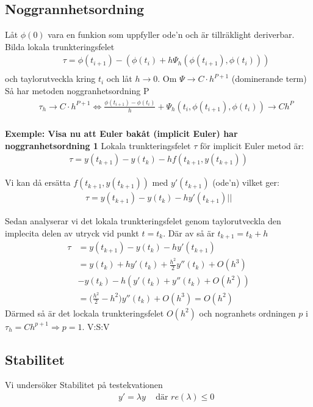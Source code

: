 \documentclass{article}
\begin{document}
\subsection{Noggrannhetsordning}
Låt $\phi(0)$ vara en funkion som uppfyller ode'n och är tillräklight deriverbar.
Bilda lokala trunkteringsfelet
\begin{align*}
  &\quad \tau = \phi(t_{i+1})-(\phi(t_i)+h\Psi_h(\phi(t_{i+1}),\phi(t_i))) \\
\end{align*}
och taylorutveckla kring $t_i$ och låt $h\to0$. 
Om $\Psi\to{C\cdot{h^{P+1}}}$ (dominerande term)
Så har metoden noggranhetsordning P
\begin{align*}
  &\quad \tau_h\to{C\cdot{h^{P+1}}} \Leftrightarrow \frac{\phi(t_{i+1})-\phi(t_i)}{h}+\Psi_h(t_i,\phi(t_{i+1}),\phi(t_i))\to{Ch^P} \\
\end{align*}


\textbf{Exemple: Visa nu att Euler bakåt (implicit Euler) har noggranhetsordning 1} \newline
Lokala trunkteringsfelet $\tau$ för implicit Euler metod är:
\begin{align*}
  \tau = y(t_{k+1})-y(t_k)-hf(t_{k+1},y(t_{k+1}))
\end{align*}

Vi kan då ersätta $f(t_{k+1},y(t_{k+1}))$ med $y'(t_{k+1})$ (ode'n) vilket ger:
\begin{align*}
  \tau = y(t_{k+1})-y(t_k)-hy'(t_{k+1})||
\end{align*}

Sedan analyserar vi det lokala trunkteringsfelet genom taylorutveckla
den implecita delen av utryck vid punkt $t=t_k$.
Där av så är $t_{k+1}=t_k+h$
\begin{align*}
  \tau &= y(t_{k+1})-y(t_k)-hy'(t_{k+1})  \\
  &= y(t_k)+hy'(t_k)+\frac{h^2}{2}y''(t_k)+O(h^3) \\
  &-y(t_k)-h(y'(t_k)+y''(t_k)+O(h^2)) \\
  &= \big( \frac{h^2}{2} - h^2 \big)y''(t_k)+O(h^3) = O(h^2)
\end{align*}
Därmed så är det lockala trunkteringsfelet $O(h^2)$ och nogranhets ordningen
$p$ i $\tau_{h}=Ch^{p+1}\Rightarrow p=1$. V:S:V 

\newpage

\subsection{Stabilitet}
Vi undersöker Stabilitet på testekvationen
\begin{align*}
  &\quad  y'=\lambda y \;\;\; \text{ där } re(\lambda)\leq 0 \\
\end{align*}
\end{document}
